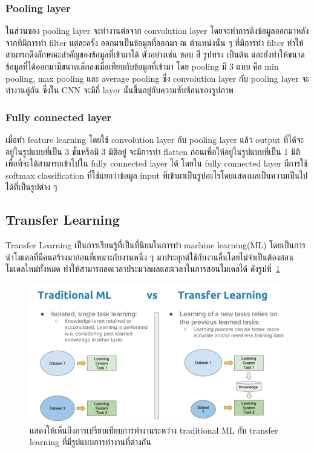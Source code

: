\documentclass[12pt,oneside,openright,a4paper]{cpe-thai-project}
\begin{document}
\subsubsection{Pooling layer}
\par\setlength{\parindent}{5ex}
ในส่วนของ pooling layer จะทำงานต่อจาก convolution layer โดยจะทำการดึงข้อมูลออกมาหลังจากที่มีการทำ filter แต่ละครั้ง ออกมาเป็นข้อมูลที่ออกมา ณ ตำแหน่งนั้น ๆ ที่มีการทำ filter ทำให้สามารถดึงลักษณะสำคัญของข้อมูลที่เข้ามาได้ ตัวอย่างเช่น ขอบ สี รูปทรง เป็นต้น และยังทำให้ขนาดข้อมูลที่ได้ออกมามีขนาดเล็กลงเมื่อเทียบกับข้อมูลที่เข้ามา โดย pooling มี 3 แบบ คือ min pooling, max pooling และ average pooling ซึ่ง convolution layer กับ pooling layer จะทำงานคู่กัน ซึ่งใน CNN จะมีกี่ layer นั้นขึ้นอยู่กับความซับซ้อนของรูปภาพ

\subsubsection{Fully connected layer}
\par\setlength{\parindent}{5ex}
เมื่อทำ feature learning โดยใช้ convolution layer กับ pooling layer แล้ว output ที่ได้จะอยู่ในรูปแบบที่เป็น 3 ชั้นหรือมี 3 มิติอยู่ จะมีการทำ flatten ก่อนเพื่อให้อยู่ในรูปแบบที่เป็น 1 มิติ เพื่อที่จะได้สามารถเข้าไปใน fully connected layer ได้ โดยใน fully connected layer มีการใช้ softmax classification ที่ใช้แยกว่าข้อมูล input ที่เข้ามาเป็นรูปอะไรโดยแสดงผลเป็นความเป็นไปได้ที่เป็นรูปต่าง ๆ 

\subsection{Transfer Learning}
\par\setlength{\parindent}{5ex}
Transfer Learning เป็นการเรียนรู้ที่เป็นที่นิยมในการทำ machine learning(ML) โดยเป็นการนำโมเดลที่มีคนสร้างมาก่อนที่เหมาะกับงานหนึ่ง ๆ มาประยุกต์ใช้กับงานอื่นโดยไม่จำเป็นต้องสอนโมเดลใหม่ทั้งหมด 
ทำให้สามารถลดเวลาประมวลผลและเวลาในการสอนโมเดลได้ ดังรูปที่~\ref{fig:ml-tl}

\newpage

\begin{figure}[!h]
  \centering
  \includegraphics[width=12cm]{./image/unit4.png}
  \caption{แสดงให้เห็นถึงการเปรียบเทียบการทำงานระหว่าง traditional ML กับ transfer learning ที่มีรูปแบบการทำงานที่ต่างกัน \cite{brownlee2017gentle}}
  \label{fig:ml-tl}
\end{figure}
\end{document}
